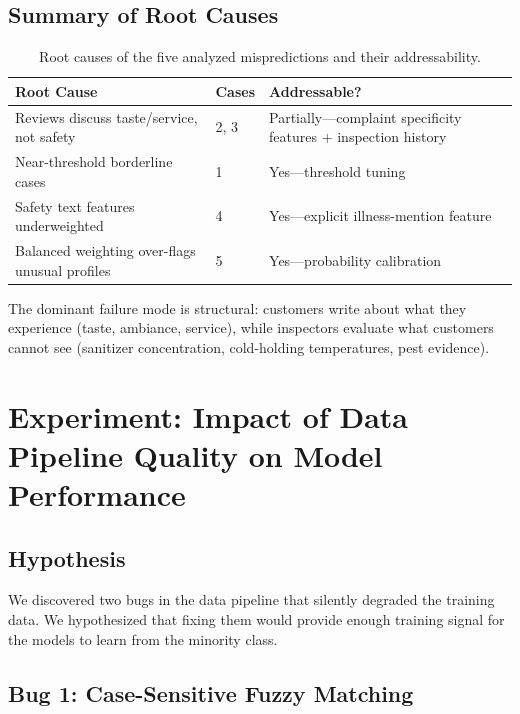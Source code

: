 \documentclass{article}
\begin{document}
\subsection{Summary of Root Causes}

\begin{table}[h]
\centering
\caption{Root causes of the five analyzed mispredictions and their addressability.}
\label{tab:error_summary}
\begin{tabular}{llp{6.5cm}}
\toprule
\textbf{Root Cause} & \textbf{Cases} & \textbf{Addressable?} \\
\midrule
Reviews discuss taste/service, not safety & 2, 3 & Partially---complaint specificity features + inspection history \\
Near-threshold borderline cases & 1 & Yes---threshold tuning \\
Safety text features underweighted & 4 & Yes---explicit illness-mention feature \\
Balanced weighting over-flags unusual profiles & 5 & Yes---probability calibration \\
\bottomrule
\end{tabular}
\end{table}

The dominant failure mode is structural: customers write about what they experience (taste, ambiance, service), while inspectors evaluate what customers cannot see (sanitizer concentration, cold-holding temperatures, pest evidence).

\section{Experiment: Impact of Data Pipeline Quality on Model Performance}
\label{sec:experiment}

\subsection{Hypothesis}

We discovered two bugs in the data pipeline that silently degraded the training data. We hypothesized that fixing them would provide enough training signal for the models to learn from the minority class.

\subsection{Bug 1: Case-Sensitive Fuzzy Matching}
\end{document}
